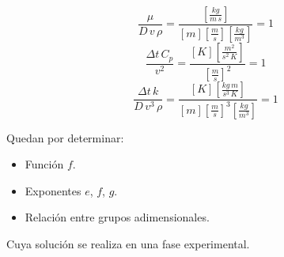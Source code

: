 \begin{enumerate}
\begin{equation*}
        \end{equation*}
        \begin{equation*}
            \frac{\mu}{D\,v\,\rho} =
            \dfrac{\left[\frac{kg}{m\,s}\right]}
            {[m]\left[\frac{m}{s}\right]\left[\frac{kg}{m^3}\right]} = 1
        \end{equation*}
        \begin{equation*}
            \frac{\Delta{t}\,C_p}{v^2} =
            \dfrac{[K]\left[\frac{m^2}{s^2\,K}\right]}
            {\left[\frac{m}{s}\right]^2} = 1
        \end{equation*}
        \begin{equation*}
            \frac{\Delta{t}\,k}{D\,v^3\,\rho} =
            \dfrac{[K]\left[\frac{kg\,m}{s^3\,K}\right]}
            {[m]\left[\frac{m}{s}\right]^3\left[\frac{kg}{m^3}\right]} = 1
        \end{equation*}
\end{enumerate}

Quedan por determinar:
\begin{itemize}
    \item Función $f$.
    \item Exponentes $e$, $f$, $g$.
    \item Relación entre grupos adimensionales.
\end{itemize}

Cuya solución se realiza en una fase experimental.

